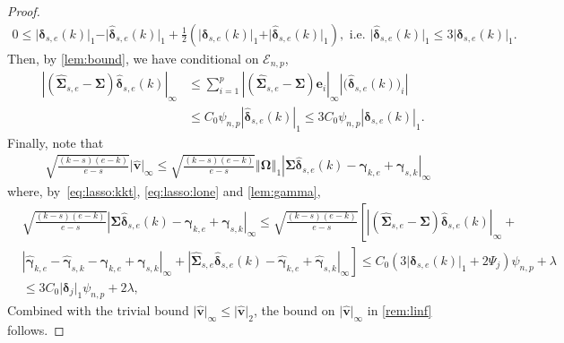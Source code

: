 \documentclass[11pt, a4paper]{article}
\newcommand{\mbf}{\mathbf}
\newcommand{\mc}{\mathcal}
\renewcommand{\l}{\left}
\renewcommand{\r}{\right}
\def\wh{\widehat}
\newcommand{\nn}{\nonumber}
\theoremstyle{definition}
\theoremstyle{definition}
\theoremstyle{definition}
\theoremstyle{definition}
\theoremstyle{definition}
\theoremstyle{remark}
\theoremstyle{definition}
\theoremstyle{definition}
\theoremstyle{definition}
\begin{document}
\begin{proof}
	\begin{align*}
	0 \le \vert \bm\delta_{s, e}(k) \vert_1 - \vert \wh{\bm\delta}_{s, e}(k) \vert_1 + \frac{1}{2} \l( \vert \bm\delta_{s, e}(k) \vert_1 + \vert \wh{\bm\delta}_{s, e}(k) \vert_1\r), \text{ \ i.e. \ }
	\vert \wh{\bm\delta}_{s, e}(k) \vert_1 \le 3 \vert \bm\delta_{s, e}(k) \vert_1.
	\end{align*}
	Then, by \cref{lem:bound}, we have conditional on $\mc E_{n, p}$,
	\begin{align}
	\l\vert \l( \wh{\bm\Sigma}_{s, e} - \bm\Sigma \r)  \wh{\bm\delta}_{s, e}(k) \r\vert_{\infty} &\le \sum_{i = 1}^p \l\vert \l( \wh{\bm\Sigma}_{s, e} - \bm\Sigma \r)  \mbf e_i \r\vert_{\infty}\l\vert\bigl(\wh{\bm\delta}_{s, e} (k)\bigr)_i\r\vert \nn\\
	&\le C_0 \psi_{n,p}\l\vert\wh{\bm\delta}_{s, e}(k)\r\vert_1 \le 3C_0\psi_{n,p} \l\vert{\bm\delta}_{s, e}(k)\r\vert_1.
	\label{eq:lasso:lone}
	\end{align}
	Finally, note that 
	\begin{align*}
	& \sqrt{\frac{(k - s)(e - k)}{e - s}} \vert \wh{\mbf v} \vert_\infty \le 
	\sqrt{\frac{(k - s)(e - k)}{e - s}} \l\Vert \bm\Omega \r\Vert_1 \l\vert \bm\Sigma \wh{\bm\delta}_{s, e}(k) - {\bm\gamma}_{k, e} + {\bm\gamma}_{s, k} \r\vert_\infty
	\end{align*}
	where, by~\eqref{eq:lasso:kkt}, \eqref{eq:lasso:lone} and \cref{lem:gamma},
	\begin{align*}
	& \sqrt{\frac{(k - s)(e - k)}{e - s}} \l\vert \bm\Sigma \wh{\bm\delta}_{s, e}(k) - {\bm\gamma}_{k, e} + {\bm\gamma}_{s, k} \r\vert_\infty \le \sqrt{\frac{(k - s)(e - k)}{e - s}} \l[ \l\vert \l( \wh{\bm\Sigma}_{s, e} - \bm\Sigma \r)  \wh{\bm\delta}_{s, e}(k) \r\vert_{\infty} + \r.
	\\
	& \l. \l\vert \wh{\bm\gamma}_{k, e} - \wh{\bm\gamma}_{s, k} - {\bm\gamma}_{k, e} + {\bm\gamma}_{s, k} \r\vert_\infty +  \l\vert \wh{\bm\Sigma}_{s, e} \wh{\bm\delta}_{s, e}(k) - \wh{\bm\gamma}_{k, e} + \wh{\bm\gamma}_{s, k} \r\vert_{\infty}
	\r] \le C_0 \l( 3\vert \bm\delta_{s, e}(k) \vert_1 + 2 \Psi_j \r) \psi_{n, p} + \lambda
	\\
	& \le 3 C_0 \vert \bm\delta_j \vert_1 \psi_{n, p} + 2 \lambda,
	\end{align*}
	Combined with the trivial bound $\vert \wh{\mbf v} \vert_\infty \le \vert \wh{\mbf v} \vert_2$, the bound on $\vert \wh{\mbf v} \vert_\infty$ in \cref{rem:linf} follows.
	

\end{proof}
\end{document}
